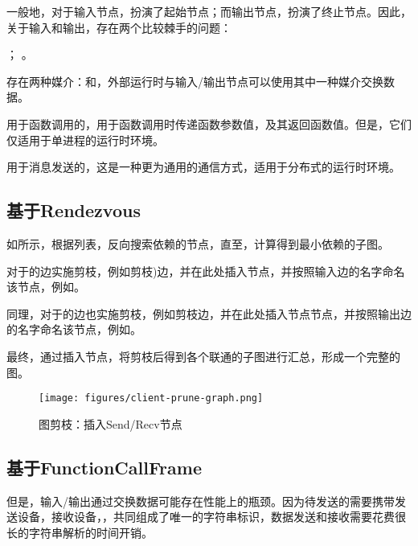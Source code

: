 \begin{content}
一般地，对于输入节点，扮演了起始节点；而输出节点，扮演了终止节点。因此，关于输入和输出，存在两个比较棘手的问题：

\begin{enum}
  ；
  。
\end{enum}

存在两种媒介：和，外部运行时与输入/输出节点可以使用其中一种媒介交换数据。

用于函数调用的，用于函数调用时传递函数参数值，及其返回函数值。但是，它们仅适用于单进程的运行时环境。

用于消息发送的，这是一种更为通用的通信方式，适用于分布式的运行时环境。

\subsection{基于Rendezvous}

如所示，根据列表，反向搜索依赖的节点，直至，计算得到最小依赖的子图。

对于的边实施剪枝，例如剪枝)边，并在此处插入节点，并按照输入边的名字命名该节点，例如。

同理，对于的边也实施剪枝，例如剪枝边，并在此处插入节点节点，并按照输出边的名字命名该节点，例如。

最终，通过插入节点，将剪枝后得到各个联通的子图进行汇总，形成一个完整的图。

\begin{figure}[H]
\centering
\texttt{[image: figures/client-prune-graph.png]}
\caption{图剪枝：插入Send/Recv节点}
 \label{fig:client-prune-graph}
\end{figure}

\subsection{基于FunctionCallFrame}

但是，输入/输出通过交换数据可能存在性能上的瓶颈。因为待发送的需要携带发送设备，接收设备，，共同组成了唯一的字符串标识，数据发送和接收需要花费很长的字符串解析的时间开销。


\end{content}
